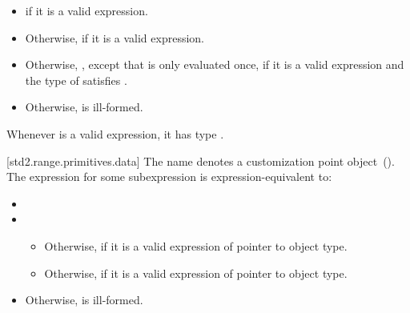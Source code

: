 \begin{itemize}
\item
   if it is a valid expression.

\item
  Otherwise,  if it is a valid expression.

\item
  Otherwise, ,
  except that  is only evaluated once, if it is a valid expression and the type of
   satisfies .

\item
  Otherwise,  is ill-formed.
\end{itemize}

\pnum
\enternote Whenever  is a valid expression, it
has type . \exitnote

[std2.range.primitives.data]{}
\pnum
The name  denotes a customization point
object~(). The expression
 for some subexpression  is
expression-equivalent to:

\begin{itemize}
\item

\item {}
  \begin{itemize}
  \item
    Otherwise,  if it is a valid expression of pointer to object type.

  \item
    Otherwise,  if it is a valid expression of pointer to object type.
  \end{itemize}

\item
  Otherwise,  is ill-formed.
\end{itemize}

